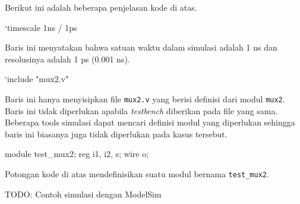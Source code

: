 Berikut ini adalah beberapa penjelasan kode di atas.

\begin{verilogcode}
`timescale 1ns / 1ps
\end{verilogcode}
Baris ini menyatakan bahwa satuan waktu dalam simulasi adalah 1 ns dan
resolusinya adalah 1 ps (0.001 ns).

\begin{verilogcode}
`include "mux2.v"
\end{verilogcode}
Baris ini hanya menyisipkan file {\tt mux2.v} yang berisi definisi dari modul {\tt mux2}.
Baris ini tidak diperlukan apabila \textit{testbench} diberikan pada file yang sama.
Beberapa tools simulasi dapat mencari definisi modul yang diperlukan sehingga
baris ini biasanya juga tidak diperlukan pada kasus tersebut.

\begin{verilogcode}
module test_mux2;
  reg i1, i2, s;
  wire o;
\end{verilogcode}

Potongan kode di atas mendefinisikan suatu modul bernama {\tt\small test\_mux2}.

{\color{red} TODO: Contoh simulasi dengan ModelSim}
